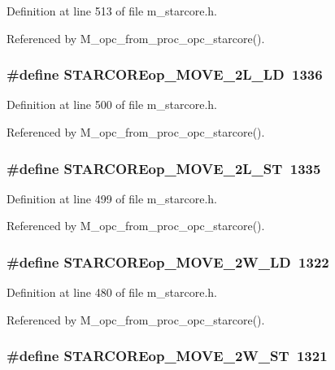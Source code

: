 Definition at line 513 of file m\_\-starcore.h.

Referenced by M\_\-opc\_\-from\_\-proc\_\-opc\_\-starcore().
\subsubsection{\setlength{\rightskip}{0pt plus 5cm}\#define STARCOREop\_\-MOVE\_\-2L\_\-LD~1336}\label{m__starcore_8h_2a39c6673a4fef32be24d26c9f83fd9d}




Definition at line 500 of file m\_\-starcore.h.

Referenced by M\_\-opc\_\-from\_\-proc\_\-opc\_\-starcore().
\subsubsection{\setlength{\rightskip}{0pt plus 5cm}\#define STARCOREop\_\-MOVE\_\-2L\_\-ST~1335}\label{m__starcore_8h_dfd2980c8e9566018eef52a03b44d596}




Definition at line 499 of file m\_\-starcore.h.

Referenced by M\_\-opc\_\-from\_\-proc\_\-opc\_\-starcore().
\subsubsection{\setlength{\rightskip}{0pt plus 5cm}\#define STARCOREop\_\-MOVE\_\-2W\_\-LD~1322}\label{m__starcore_8h_7d5513db1a65042f6828ab35e4e2a532}




Definition at line 480 of file m\_\-starcore.h.

Referenced by M\_\-opc\_\-from\_\-proc\_\-opc\_\-starcore().
\subsubsection{\setlength{\rightskip}{0pt plus 5cm}\#define STARCOREop\_\-MOVE\_\-2W\_\-ST~1321}\label{m__starcore_8h_59d36c1aaae8df06197229d678202344}




